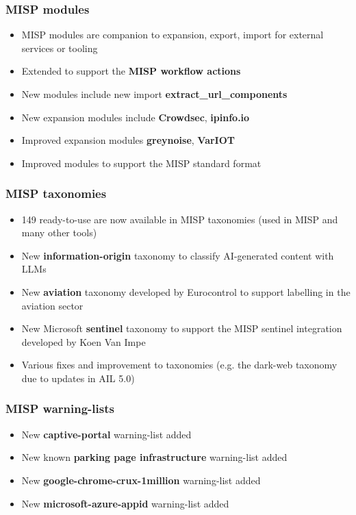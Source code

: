 \begin{frame}
\frametitle{MISP modules}
    \begin{itemize}
        \item MISP modules are companion to expansion, export, import for external services or tooling
        \item Extended to support the {\bf MISP workflow actions}
        \item New modules include new import {\bf extract\_url\_components}
        \item New expansion modules include {\bf Crowdsec}, {\bf ipinfo.io}
        \item Improved expansion modules  {\bf greynoise}, {\bf VarIOT}
        \item Improved modules to support the MISP standard format
    \end{itemize}
\end{frame}

\begin{frame}
    \frametitle{MISP taxonomies}
    \begin{itemize}
        \item 149 ready-to-use are now available in MISP taxonomies (used in MISP and many other tools)
        \item New {\bf information-origin} taxonomy to classify AI-generated content with LLMs
        \item New {\bf aviation} taxonomy developed by Eurocontrol to support labelling in the aviation sector
        \item New Microsoft {\bf sentinel} taxonomy to support the MISP sentinel integration developed by Koen Van Impe
        \item Various fixes and improvement to taxonomies (e.g. the dark-web taxonomy due to updates in AIL 5.0)
    \end{itemize}
\end{frame}

\begin{frame}
    \frametitle{MISP warning-lists}
    \begin{itemize}
        \item New {\bf captive-portal} warning-list added
        \item New known {\bf parking page infrastructure} warning-list added 
        \item New {\bf google-chrome-crux-1million} warning-list added
        \item New {\bf microsoft-azure-appid} warning-list added
    \end{itemize}
\end{frame}

